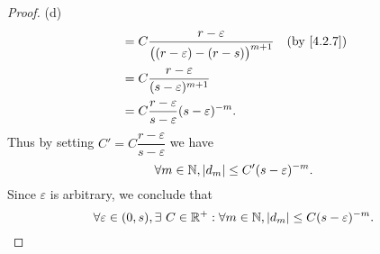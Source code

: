 \begin{proof}{(d)}
\begin{align*}
                                & = C \dfrac{r - \varepsilon}{\big((r - \varepsilon) - (r - s)\big)^{m + 1}}                      &  & \by{4.2.7}                  \\
                                & = C \dfrac{r - \varepsilon}{(s - \varepsilon)^{m + 1}}                                                                           \\
                                & = C \dfrac{r - \varepsilon}{s - \varepsilon} (s - \varepsilon)^{-m}.
  \end{align*}
  Thus by setting \(C' = C \dfrac{r - \varepsilon}{s - \varepsilon}\) we have
  \[
    \forall m \in \mathbb{N}, \left\lvert d_m\right\rvert \leq C' (s - \varepsilon)^{-m}.
  \]
  Since \(\varepsilon\) is arbitrary, we conclude that
  \[
    \forall \varepsilon \in (0, s), \exists\ C \in \mathbb{R}^+ : \forall m \in \mathbb{N}, \left\lvert d_m\right\rvert \leq C (s - \varepsilon)^{-m}.
  \]
\end{proof}

